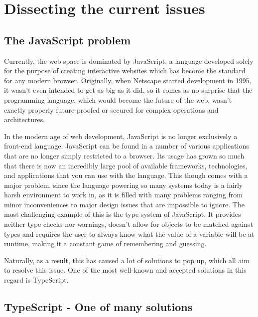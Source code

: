 \section{Dissecting the current issues}

\subsection{The JavaScript problem}

Currently, the web space is dominated by JavaScript, a language developed solely for the purpose of creating interactive websites which has become the standard for any modern browser. Originally, when Netscape started development in 1995, it wasn't even intended to get as big as it did, so it comes as no surprise that the programming language, which would become the future of the web, wasn't exactly properly future-proofed or secured for complex operations and architectures.

In the modern age of web development, JavaScript is no longer exclusively a front-end language. JavaScript can be found in a number of various applications that are no longer simply restricted to a browser. Its usage has grown so much that there is now an incredibly large pool of available frameworks, technologies, and applications that you can use with the language. This though comes with a major problem, since the language powering so many systems today is a fairly harsh environment to work in, as it is filled with many problems ranging from minor inconveniences to major design issues that are impossible to ignore. The most challenging example of this is the type system of JavaScript. It provides neither type checks nor warnings, doesn't allow for objects to be matched against types and requires the user to always know what the value of a variable will be at runtime, making it a constant game of remembering and guessing.

Naturally, as a result, this has caused a lot of solutions to pop up, which all aim to resolve this issue. One of the most well-known and accepted solutions in this regard is TypeScript.

\subsection{TypeScript - One of many solutions}

